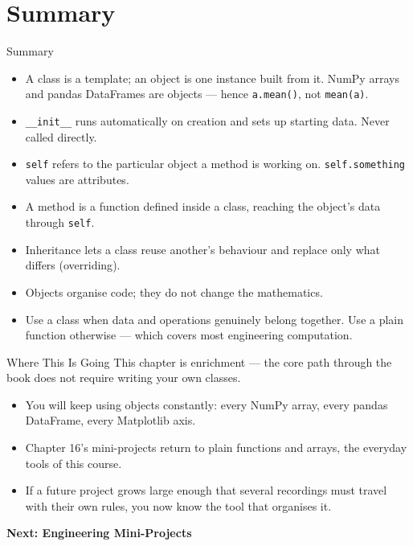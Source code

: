 \documentclass[9pt,aspectratio=169,xcolor=table]{beamer}
\begin{document}
\section{Summary}

\begin{frame}{Summary}
    \leavevmode
    \small
    \begin{itemize}\itemsep3pt
        \item A \alert{class} is a template; an \alert{object} is one
              instance built from it. NumPy arrays and pandas DataFrames
              are objects --- hence \texttt{a.mean()}, not
              \texttt{mean(a)}.
        \item \texttt{\_\_init\_\_} runs automatically on creation and
              sets up starting data. Never called directly.
        \item \texttt{self} refers to the particular object a method is
              working on. \texttt{self.something} values are
              \alert{attributes}.
        \item A \alert{method} is a function defined inside a class,
              reaching the object's data through \texttt{self}.
        \item \alert{Inheritance} lets a class reuse another's behaviour
              and replace only what differs (\alert{overriding}).
        \item Objects organise code; they do not change the mathematics.
        \item Use a class when data and operations genuinely belong
              together. Use a plain function otherwise --- which covers
              most engineering computation.
    \end{itemize}
\end{frame}

\begin{frame}{Where This Is Going}
    \leavevmode
    \small
    This chapter is enrichment --- the core path through the book does
    not require writing your own classes.

    \vspace{3mm}
    \begin{itemize}
        \item You will keep \alert{using} objects constantly: every
              NumPy array, every pandas DataFrame, every Matplotlib axis.
        \item Chapter 16's mini-projects return to plain functions and
              arrays, the everyday tools of this course.
        \item If a future project grows large enough that several
              recordings must travel with their own rules, you now know
              the tool that organises it.
    \end{itemize}

    \vspace{4mm}
    \begin{center}
        \large\color{primary}\textbf{Next: Engineering Mini-Projects}
    \end{center}
\end{frame}
\end{document}
